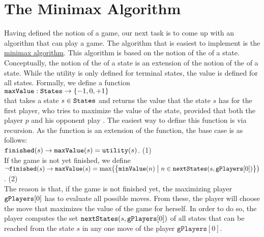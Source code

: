 \section{The Minimax Algorithm \label{sec:minimax}}
Having defined the notion of a game, our next task is to come up with an algorithm that can play a game.  The
algorithm that is easiest to implement is the \href{https://en.wikipedia.org/wiki/Minimax}{minimax algorithm}.  This
algorithm is based on the notion of the  of a state. 
Conceptually, the notion of the  of a state is an extension of the notion of the 
 of a state.  While the utility is only defined for terminal
states, the value is defined for all states.  Formally, we define a function
\\[0.2cm]
\hspace*{1.3cm}
$\texttt{maxValue}: \texttt{States} \rightarrow \{-1, 0, +1\}$
\\[0.2cm]
that takes a state $s \in \texttt{States}$ and returns the value that the state $s$ has for the first player, who
tries to maximize the value of the state, provided that both the player $p$ and his opponent play
.  The easiest way to define this function is via recursion.  As the 
 function is an extension of the  function, the base case is as follows:
\\[0.2cm]
\hspace*{0.3cm}
$\texttt{finished}(s) \rightarrow \texttt{maxValue}(s) = \texttt{utility}(s)$. \hspace*{\fill} (1)
\\[0.2cm]
If the game is not yet finished, we define
\\[0.2cm]
\hspace*{0.3cm}
$\neg \texttt{finished}(s) \rightarrow 
 \texttt{maxValue}(s) = \max\bigl(\bigl\{
                     \texttt{minValue}(n) \bigm| n \in \texttt{nextStates}(s, \mathtt{gPlayers}[0])
                     \bigr\}\bigr)
$.  \hspace*{\fill} (2)
\\[0.2cm]
The reason is that, if the game is not finished yet, the maximizing player $\texttt{gPlayers}[0]$ has to
evaluate all possible moves.   
From these, the player will choose the move that maximizes the value of the game for herself.  In order to
do so, the player computes the set 
$\texttt{nextStates}(s, \mathtt{gPlayers}[0])$ of all states that can be reached from the state $s$ in any one move of the player $\mathtt{gPlayers}[0]$.

